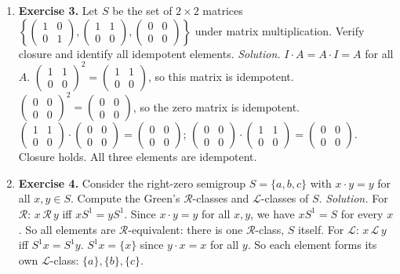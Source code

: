 \begin{enumerate}[leftmargin=*,itemsep=0.9em]
\item \textbf{Exercise 3.} Let $S$ be the set of $2\times 2$ matrices $\left\{\begin{pmatrix}1&0\\0&1\end{pmatrix},\begin{pmatrix}1&1\\0&0\end{pmatrix},\begin{pmatrix}0&0\\0&0\end{pmatrix}\right\}$ under matrix multiplication. Verify closure and identify all idempotent elements. \emph{Solution.} $I\cdot A=A\cdot I=A$ for all $A$. $\begin{pmatrix}1&1\\0&0\end{pmatrix}^2=\begin{pmatrix}1&1\\0&0\end{pmatrix}$, so this matrix is idempotent. $\begin{pmatrix}0&0\\0&0\end{pmatrix}^2=\begin{pmatrix}0&0\\0&0\end{pmatrix}$, so the zero matrix is idempotent. $\begin{pmatrix}1&1\\0&0\end{pmatrix}\cdot\begin{pmatrix}0&0\\0&0\end{pmatrix}=\begin{pmatrix}0&0\\0&0\end{pmatrix}$; $\begin{pmatrix}0&0\\0&0\end{pmatrix}\cdot\begin{pmatrix}1&1\\0&0\end{pmatrix}=\begin{pmatrix}0&0\\0&0\end{pmatrix}$. Closure holds. All three elements are idempotent.

\item \textbf{Exercise 4.} Consider the right-zero semigroup $S=\{a,b,c\}$ with $x\cdot y=y$ for all $x,y\in S$. Compute the Green's $\mathcal{R}$-classes and $\mathcal{L}$-classes of $S$. \emph{Solution.} For $\mathcal{R}$: $x\,\mathcal{R}\,y$ iff $xS^1=yS^1$. Since $x\cdot y=y$ for all $x,y$, we have $xS^1=S$ for every $x$. So all elements are $\mathcal{R}$-equivalent: there is one $\mathcal{R}$-class, $S$ itself. For $\mathcal{L}$: $x\,\mathcal{L}\,y$ iff $S^1 x=S^1 y$. $S^1 x=\{x\}$ since $y\cdot x=x$ for all $y$. So each element forms its own $\mathcal{L}$-class: $\{a\},\{b\},\{c\}$.


\end{enumerate}
